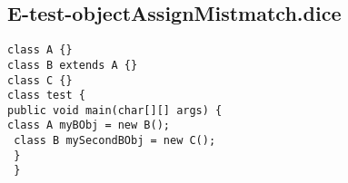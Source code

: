 \subsection{E-test-objectAssignMistmatch.dice}
\begin{verbatim}
class A {}
class B extends A {}
class C {}
class test {
public void main(char[][] args) {
class A myBObj = new B();
 class B mySecondBObj = new C();
 }
 }
\end{verbatim}